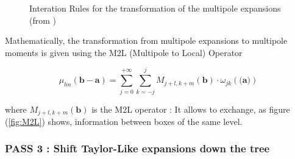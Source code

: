 \documentclass[11pt,twoside,a4paper]{report}
\begin{document}
	 
 \begin{figure}[H]
    \centering 
    \caption{Interation Rules for the transformation of the multipole expansions (from \cite{phdIvo})}
    \label{fig:multipole}
   \end{figure}   
   
	  Mathematically, the transformation from multipole expansions to multipole moments is given using the  M2L (Multipole to Local) Operator
	  
	  \begin{equation}
	  \mu_{lm}(\textbf{b} - \textbf{a}) = \sum\limits_{j = 0}^{+\infty} \sum\limits_{k=-j}^{j}
	  M_{j+l,k+m}(\textbf{b}) \cdot \omega_{jk}(\textbf{(a)})
	  \end{equation}
   
   	where $M_{j+l,k+m}(\textbf{b})$ is the M2L operator : It allows to exchange, as figure (\ref{fig:M2L}) shows, information between boxes of the same level.

\subsubsection{PASS 3 : Shift Taylor-Like expansions down the tree}
\end{document}
